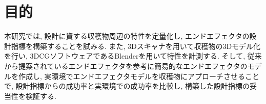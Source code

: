 \section{目的}
本研究では, 設計に資する収穫物周辺の特性を定量化し, エンドエフェクタの設計指標を構築することを試みる.
また, 3Dスキャナを用いて収穫物の3Dモデル化を行い, 3DCGソフトウェアであるBlenderを用いて特性を計測する.
そして, 従来から提案されているエンドエフェクタを参考に簡易的なエンドエフェクタのモデルを作成し, 実環境でエンドエフェクタモデルを収穫物にアプローチさせることで, 設計指標からの成功率と実環境での成功率を比較し, 構築した設計指標の妥当性を検証する.
